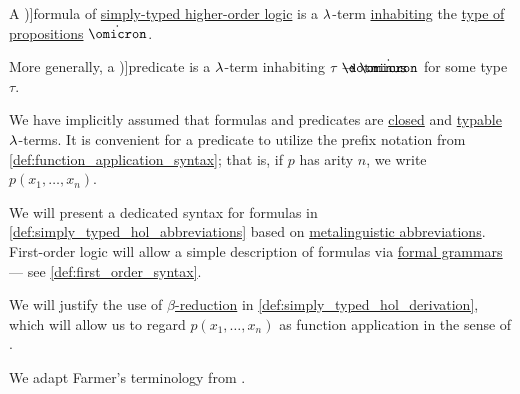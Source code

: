 \begin{definition}\label{def:simply_typed_hol_formula}\mimprovised
  A \term[en=formula (\cite[270]{Farmer2008STTVirtues})]{formula} of \hyperref[def:simply_typed_hol]{simply-typed higher-order logic} is a \( {\mathrm \lambda} \)-term \hyperref[def:type_habitation]{inhabiting} the \hyperref[def:simply_typed_hol_signature/types]{type of propositions} \( \syn\omicron \).

  More generally, a \term[en=predicate (\cite[270]{Farmer2008STTVirtues})]{predicate} is a \( {\mathrm \lambda} \)-term inhabiting \( \tau \synimplies \syn\omicron \) for some type \( \tau \).

  We have implicitly assumed that formulas and predicates are \hyperref[def:lambda_combinator]{closed} and \hyperref[def:typability]{typable} \( {\mathrm \lambda} \)-terms. It is convenient for a predicate to utilize the prefix notation from \cref{def:function_application_syntax}; that is, if \( p \) has arity \( n \), we write \( p(x_1, \ldots, x_n) \).
\end{definition}
\begin{comments}
  \item We will present a dedicated syntax for formulas in \cref{def:simply_typed_hol_abbreviations} based on \hyperref[con:metalingual_abbreviation]{metalinguistic abbreviations}. First-order logic will allow a simple description of formulas via \hyperref[def:formal_grammar]{formal grammars} --- see \ref{def:first_order_syntax}.

  \item We will justify the use of \hyperref[def:beta_eta_reduction]{\( \beta \)-reduction} in  \cref{def:simply_typed_hol_derivation}, which will allow us to regard \( p(x_1, \ldots, x_n) \) as function application in the sense of .

  \item We adapt Farmer's terminology from \cite[270]{Farmer2008STTVirtues}.
\end{comments}

